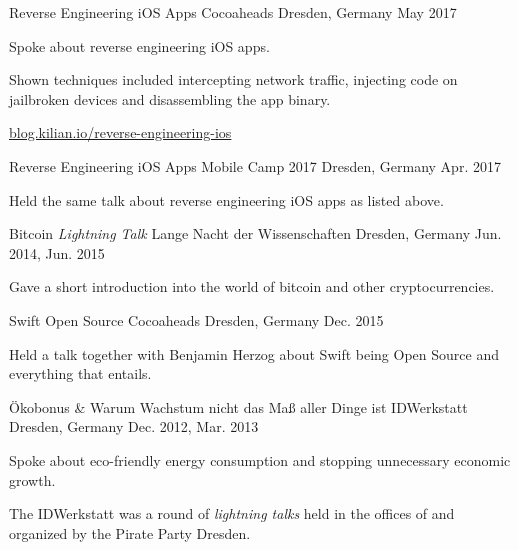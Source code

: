 

\begin{cventries}

\cventry
	{Reverse Engineering iOS Apps}
	{Cocoaheads}
	{Dresden, Germany}
	{May 2017}
	{
		\begin{cvitems}
			\item {Spoke about reverse engineering iOS apps.}
			\item {Shown techniques included intercepting network traffic, injecting code on jailbroken devices and disassembling the app binary.}
			\item \href{http://blog.kilian.io/reverse-engineering-ios/}{blog.kilian.io/reverse-engineering-ios}
		\end{cvitems}
	}
	
\cventry
	{Reverse Engineering iOS Apps}
	{Mobile Camp 2017}
	{Dresden, Germany}
	{Apr. 2017}
	{
		\begin{cvitems}
			\item {Held the same talk about reverse engineering iOS apps as listed above.}
		\end{cvitems}
	}
	
\cventry
	{Bitcoin \emph{Lightning Talk}}
	{Lange Nacht der Wissenschaften}
	{Dresden, Germany}
	{Jun. 2014, Jun. 2015}
	{
		\begin{cvitems}
			\item {Gave a short introduction into the world of bitcoin and other cryptocurrencies.}
		\end{cvitems}
	}

\cventry
	{Swift Open Source}
	{Cocoaheads}
	{Dresden, Germany}
	{Dec. 2015}
	{
		\begin{cvitems}
			\item {Held a talk together with Benjamin Herzog about Swift being Open Source and everything that entails.}
		\end{cvitems}
	}

\cventry
	{Ökobonus \& Warum Wachstum nicht das Maß aller Dinge ist}
	{IDWerkstatt}
	{Dresden, Germany}
	{Dec. 2012, Mar. 2013}
	{
		\begin{cvitems}
			\item {Spoke about eco-friendly energy consumption and stopping unnecessary economic growth.}
			\item {The IDWerkstatt was a round of \emph{lightning talks} held in the offices of and organized by the Pirate Party Dresden.}
		\end{cvitems}
	}

\end{cventries}
